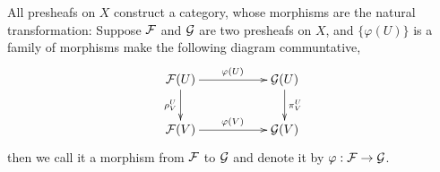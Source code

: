 \para All presheafs on $X$ construct a category, whose morphisms are the natural transformation: Suppose $\mathcal{F}$ and $\mathcal{G}$ are two presheafs on $X$, and $\{\varphi(U)\}$ is a family of morphisms make the following diagram communtative,
\[
	\xymatrix{
		\calf(U)\ar[rr]^{\varphi(U)} \ar[d]_{\rho^U_V}&&\calg(U) \ar[d]^{\pi^U_V}\\
		\calf(V)\ar[rr]^{\varphi(V)}&&\calg(V)
	}
\]
then we call it a morphism from $\mathcal{F}$ to $\mathcal{G}$ and denote it by $\varphi:\mathcal{F}\to\mathcal{G}$. 